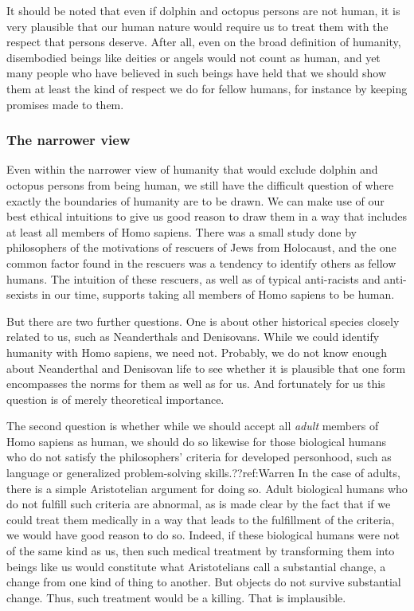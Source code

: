 It should be noted that even if dolphin and octopus persons are not human, it is very plausible that our human nature would require us to treat them with the
respect that persons deserve. After all, even on the broad definition of humanity, disembodied beings like deities or angels would not count as human, and yet
many people who have believed in such beings have held that we should show them at least the kind of respect we do for fellow humans, for instance by keeping
promises made to them.

\subsubsection{The narrower view}
Even within the narrower view of humanity that would exclude dolphin and octopus persons from being human, we still have the difficult question of where exactly the boundaries of humanity are to be drawn. 
We can make use of our best ethical intuitions to give us good reason to draw them in a way that includes at least all 
members of Homo sapiens. There was a small study done by philosophers of the motivations of rescuers of Jews from Holocaust, and the one common
factor found in the rescuers was a tendency to identify others as fellow humans. The intuition of these rescuers, as well as of typical anti-racists and 
anti-sexists in our time, supports taking all members of Homo sapiens to be human. 

But there are two further questions. One is about other historical species closely related to us, such as Neanderthals and Denisovans. While we could
identify humanity with Homo sapiens, we need not. Probably, we do not know enough about Neanderthal and Denisovan life to see whether it is 
plausible that one form encompasses the norms for them as well as for us. And fortunately for us this question is of merely theoretical importance.

The second question is whether while we should accept all \textit{adult} members of Homo sapiens as human, we should do so likewise for those 
biological humans who do not satisfy the philosophers' criteria for developed personhood, such as language or generalized problem-solving skills.??ref:Warren
In the case of adults, there is a simple Aristotelian argument for doing so. Adult biological humans who do not fulfill such criteria are abnormal, as is made clear
by the fact that if we could treat them medically in a way that leads to the fulfillment of the criteria, we would have good reason to do so. Indeed, if these
biological humans were not of the same kind as us, then such medical treatment by transforming them into beings like us would constitute what Aristotelians
call a substantial change, a change from one kind of thing to another. But objects do not survive substantial change. Thus, such treatment would be a killing.
That is implausible.

